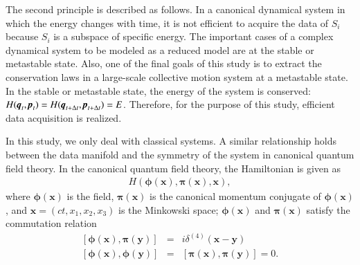 \documentclass[preprint,
bibnotes,
 amsmath,amssymb,
 aps,
]{revtex4-1}
\begin{document}
The second principle is described as follows. 
In a canonical dynamical system in which the energy changes with time, it is not efficient to acquire the data of $S_i$ because $S_i$ is a subspace of specific energy. 
The important cases of a complex dynamical system to be modeled as a reduced model are at the stable or metastable state. 
Also, one of the final goals of this study is to extract the conservation laws in a large-scale collective motion system at a metastable state. 
In the stable or metastable state, the energy of the system is conserved:  $H(\textit{\textbf{q}}_{t},\textit{\textbf{p}}_{t}) = H(\textit{\textbf{q}}_{t+\Delta t},\textit{\textbf{p}}_{t+\Delta t}) = E$. 
Therefore, for the purpose of this study, efficient data acquisition is realized.  
\par
In this study, we only deal with classical systems. A similar relationship holds between the data manifold and the symmetry of the system in canonical quantum field theory. 
In the canonical quantum field theory, the Hamiltonian is given as
\begin{eqnarray}
H\left({\bm \phi}({\bm x}),{\bm \pi}({\bm x}),{\bm x}\right),
\end{eqnarray}
where ${\bm \phi}({\bm x})$ is the field, ${\bm \pi}({\bm x})$ is the canonical momentum conjugate of ${\bm \phi}({\bm x})$, and ${\bm x}=(ct, x_1, x_2, x_3)$ is the Minkowski space; ${\bm \phi}({\bm x})$ and ${\bm \pi}({\bm x})$ satisfy the commutation relation
\begin{eqnarray}
\left[{\bm \phi}({\bm x}), {\bm \pi}({\bm y})\right] &=& i\delta^{(4)}({\bm x} - {\bm y})\\
\left[{\bm \phi}({\bm x}), {\bm \phi}({\bm y})\right] &=& \left[{\bm \pi}({\bm x}), {\bm \pi}({\bm y})\right] = 0.
\end{eqnarray}
\end{document}
